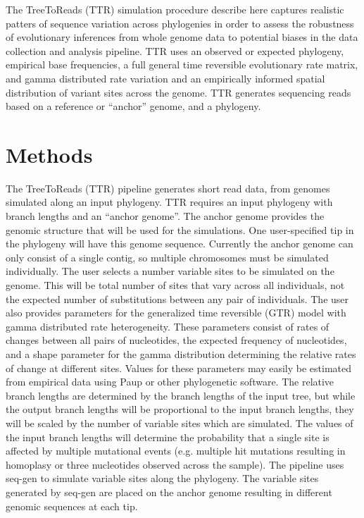 \documentclass[a4paper,10pt]{article}
\begin{document}
The TreeToReads (TTR) simulation procedure describe here captures realistic patters of sequence variation across phylogenies 
in order to assess the robustness of evolutionary inferences from whole genome data to potential biases in the
data collection and analysis pipeline.
TTR uses an observed or expected phylogeny, empirical base frequencies, a full general time reversible evolutionary rate matrix, and gamma distributed rate variation
and an empirically informed spatial distribution of variant sites across the genome.
TTR generates sequencing reads based on a reference or ``anchor'' genome, and a phylogeny.

\section{Methods}
The TreeToReads (TTR) pipeline generates short read data, from genomes simulated along an input phylogeny.
TTR requires an input phylogeny with branch lengths and an ``anchor genome''. 
The anchor genome provides the genomic structure that will be used for the simulations.
One user-specified tip in the phylogeny will have this genome sequence.
Currently the anchor genome can only consist of a single contig, so multiple chromosomes must be simulated individually.
The user selects a number variable sites to be simulated on the genome.
This will be total number of sites that vary across all individuals, not the expected number of substitutions between any pair of individuals.
The user also provides parameters for the generalized time reversible (GTR) model with gamma distributed rate heterogeneity.
These parameters consist of rates of changes between all pairs of nucleotides, the expected frequency of nucleotides, 
and a shape parameter for the gamma distribution determining the relative rates of change at different sites. 
Values for these parameters may easily be estimated from empirical data using Paup \citep{swofford_paup:_2001} or other phylogenetic software.
The relative branch lengths are determined by the branch lengths of the input tree, but while the output branch lengths will be proportional to the input branch lengths, 
they will be scaled by the number of variable sites which are simulated.
The values of the input branch lengths will determine the probability that a single site is affected by multiple mutational events 
(e.g. multiple hit mutations resulting in homoplasy or three nucleotides observed across the sample).
The pipeline uses seq-gen \citep{rambaut_seq-gen:_1997} to simulate variable sites along the phylogeny.
The variable sites generated by seq-gen are placed on the anchor genome resulting in different genomic sequences at each tip.
\end{document}
